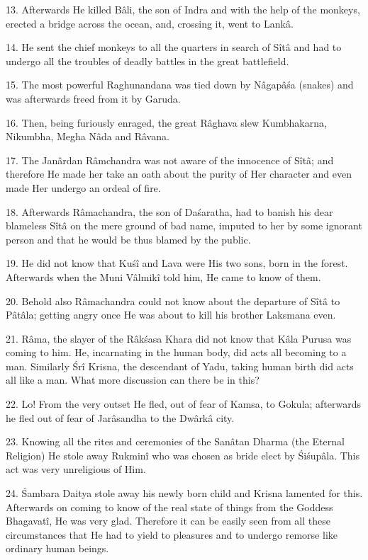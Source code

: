 13. Afterwards He killed B\^ali, the son of Indra and with the help of the monkeys, erected a bridge across the ocean, and, crossing it, went to Lank\^a.

14. He sent the chief monkeys to all the quarters in search of S\^it\^a and had to undergo all the troubles of deadly battles in the great battlefield.

15. The most powerful Raghunandana was tied down by N\^agap\^a\'sa (snakes) and was afterwards freed from it by Garuda.

16. Then, being furiously enraged, the great R\^aghava slew Kumbhakarna, Nikumbha, Megha N\^ada and R\^avana.

17. The Jan\^ardan R\^amchandra was not aware of the innocence of S\^it\^a; and therefore He made her take an oath about the purity of Her character and even made Her undergo an ordeal of fire.

18. Afterwards R\^amachandra, the son of Da\'saratha, had to banish his dear blameless S\^it\^a on the mere ground of bad name, imputed to her by some ignorant person and that he would be thus blamed by the public.

19. He did not know that Ku\'s\^i and Lava were His two sons, born in the forest. Afterwards when the Muni V\^almik\^i told him, He came to know of them.

20. Behold also R\^amachandra could not know about the departure of S\^it\^a to P\^at\^ala; getting angry once He was about to kill his brother Laksmana even.

21. R\^ama, the slayer of the R\^ak\'sasa Khara did not know that K\^ala Purusa was coming to him. He, incarnating in the human body, did acts all becoming to a man. Similarly \'Sr\^i Krisna, the descendant of Yadu, taking human birth did acts all like a man. What more discussion can there be in this?

22. Lo! From the very outset He fled, out of fear of Kamsa, to Gokula; afterwards he fled out of fear of Jar\^asandha to the Dw\^ark\^a city.

23. Knowing all the rites and ceremonies of the San\^atan Dharma (the Eternal Religion) He stole away Rukmin\^i who was chosen as bride elect by \'Si\'sup\^ala. This act was very unreligious of Him.

24. \'Sambara Daitya stole away his newly born child and Krisna lamented for this. Afterwards on coming to know of the real state of things from the Goddess Bhagavat\^i, He was very glad. Therefore it can be easily seen from all these circumstances that He had to yield to pleasures and to undergo remorse like ordinary human beings.

